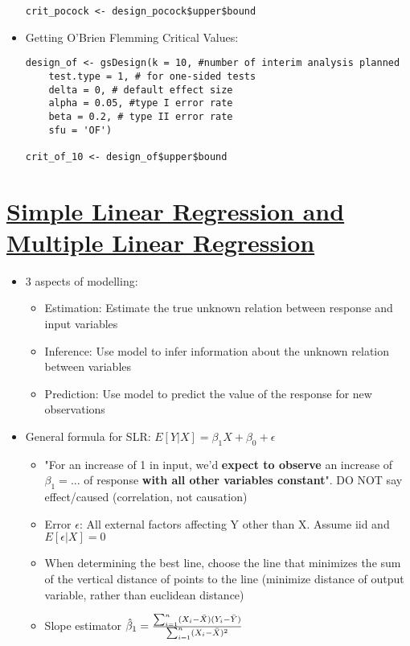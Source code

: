 \documentclass[8pt,landscape,a4paper, fleqn, dvipsnames]{extarticle}
\begin{document}
\begin{multicols*}{4}
\begin{itemize}
\begin{lstlisting}
crit_pocock <- design_pocock$upper$bound
    \end{lstlisting}
    \item Getting O'Brien Flemming Critical Values:
    \begin{lstlisting}
design_of <- gsDesign(k = 10, #number of interim analysis planned
    test.type = 1, # for one-sided tests
    delta = 0, # default effect size
    alpha = 0.05, #type I error rate
    beta = 0.2, # type II error rate
    sfu = 'OF')

crit_of_10 <- design_of$upper$bound
    \end{lstlisting}
\end{itemize}

\section*{\ul{Simple Linear Regression and Multiple Linear Regression}}
\begin{itemize}
    \item 3 aspects of modelling:
    \begin{itemize}
        \item Estimation: Estimate the true unknown relation between response and input variables
        \item Inference: Use model to infer information about the unknown relation between variables
        \item Prediction: Use model to predict the value of the response for new observations
    \end{itemize}
    \item General formula for SLR: $E[Y|X]= \beta_1 X + \beta_0 + \epsilon$
    \begin{itemize}
        \item "For an increase of 1 in input, we'd \textbf{expect to observe} an increase of $\beta_1 = ...$ of response \textbf{with all other variables constant}". DO NOT say effect/caused (correlation, not causation)
        \item Error $\epsilon$: All external factors affecting Y other than X. Assume iid and $E[\epsilon|X] = 0$
        \item When determining the best line, choose the line that minimizes the sum of the vertical distance of points to the line (minimize distance of output variable, rather than euclidean distance)
        \item Slope estimator $\hat{\beta}_1 = \frac{\sum^n_{i = 1}(X_i - \Bar{X})(Y_i - \Bar{Y})}{\sum^n_{i = 1}(X_i - \Bar{X})^2}$

\end{itemize}
\end{itemize}
\end{multicols*}
\end{document}
